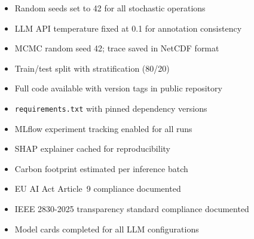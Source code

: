 \documentclass[10pt,letterpaper]{article}
\begin{document}
\begin{itemize}
  \item[$\checkmark$] Random seeds set to 42 for all stochastic operations
  \item[$\checkmark$] LLM API temperature fixed at 0.1 for annotation consistency
  \item[$\checkmark$] MCMC random seed 42; trace saved in NetCDF format
  \item[$\checkmark$] Train/test split with stratification (80/20)
  \item[$\checkmark$] Full code available with version tags in public repository
  \item[$\checkmark$] \texttt{requirements.txt} with pinned dependency versions
  \item[$\checkmark$] MLflow experiment tracking enabled for all runs
  \item[$\checkmark$] SHAP explainer cached for reproducibility
  \item[$\checkmark$] Carbon footprint estimated per inference batch
  \item[$\checkmark$] EU AI Act Article~9 compliance documented
  \item[$\checkmark$] IEEE 2830-2025 transparency standard compliance documented
  \item[$\checkmark$] Model cards completed for all LLM configurations
\end{itemize}
\end{document}
